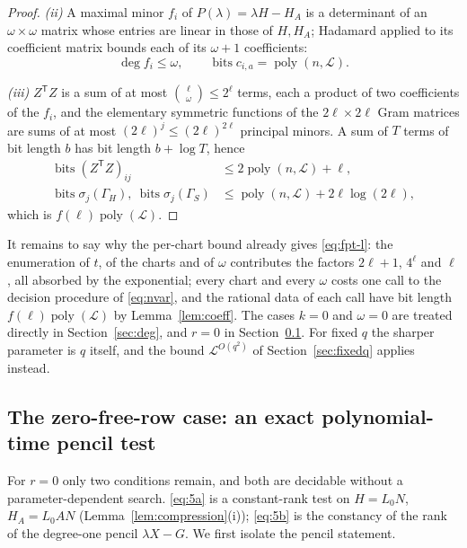 \documentclass[journal]{IEEEtran}
\theoremstyle{plainn}
\theoremstyle{remark}
\begin{document}
\begin{proof}
\emph{(ii)} A maximal minor $f_i$ of $P(\lambda)=\lambda H-H_A$ is a determinant
of an $\omega\times\omega$ matrix whose entries are linear in those of $H,H_A$;
Hadamard applied to its coefficient matrix bounds each of its $\omega+1$
coefficients:
\begin{equation*}
\deg f_i\le\omega,\qquad
\operatorname{bits}c_{i,a}=\operatorname{poly}(n,\mathcal L).
\end{equation*}

\emph{(iii)} $Z^{\mathsf T}Z$ is a sum of at most
$\binom{\ell}{\omega}\le2^{\ell}$ terms, each a product of two coefficients of
the $f_i$, and the elementary symmetric functions of the $2\ell\times2\ell$ Gram
matrices are sums of at most $(2\ell)^{j}\le(2\ell)^{2\ell}$ principal minors. A
sum of $T$ terms of bit length $b$ has bit length $b+\log T$, hence
\begin{equation*}
\begin{aligned}
\operatorname{bits}(Z^{\mathsf T}Z)_{ij}
&\le2\operatorname{poly}(n,\mathcal L)+\ell,\\
\operatorname{bits}\sigma_j(\Gamma_H),\ \operatorname{bits}\sigma_j(\Gamma_S)
&\le\operatorname{poly}(n,\mathcal L)+2\ell\log(2\ell),
\end{aligned}
\end{equation*}
which is $f(\ell)\operatorname{poly}(\mathcal L)$.
\end{proof}

It remains to say why the per-chart bound already gives \eqref{eq:fpt-l}: the enumeration of
$t$, of the charts and of $\omega$ contributes the factors $2\ell+1$, $4^{\ell}$ and $\ell$, all
absorbed by the exponential; every chart and every $\omega$ costs one call to the decision procedure
of \eqref{eq:nvar}, and the rational data of each call have bit length
$f(\ell)\operatorname{poly}(\mathcal L)$ by Lemma~\ref{lem:coeff}. The cases $k=0$ and $\omega=0$
are treated directly in Section~\ref{sec:deg}, and $r=0$ in Section~\ref{sec:zero}. For fixed $q$
the sharper parameter is $q$ itself, and the bound $\mathcal L^{O(q^2)}$ of
Section~\ref{sec:fixedq} applies instead.

\subsection{The zero-free-row case: an exact polynomial-time pencil test}\label{sec:zero}

For $r=0$ only two conditions remain, and both are decidable without a
parameter-dependent search. \eqref{eq:5a} is a constant-rank test on
$H=L_0N$, $H_A=L_0AN$ (Lemma~\ref{lem:compression}(i)); \eqref{eq:5b} is the
constancy of the rank of the degree-one pencil $\lambda X-G$. We first isolate
the pencil statement.
\end{document}
